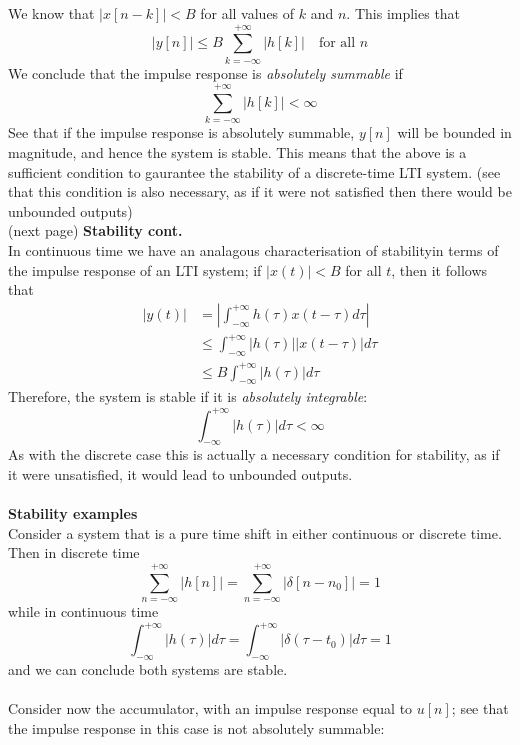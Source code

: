 \documentclass{report}
\begin{document}
We know that $|x[n-k]|<B$ for all values of $k$ and $n$. This implies that
\begin{equation*}
|y[n]|\leq B\sum^{+\infty}_{k=-\infty}|h[k]|\quad\text{for all }n
\end{equation*}
We conclude that the impulse response is \textit{absolutely summable} if
\begin{equation*}
\sum^{+\infty}_{k=-\infty}|h[k]|<\infty
\end{equation*}
See that if the impulse response is absolutely summable, $y[n]$ will be bounded in magnitude, and hence the system is stable. This means
that the above is a sufficient condition to gaurantee the stability of a discrete-time LTI system. (see that this condition 
is also necessary, as if it were not satisfied then there would be unbounded outputs)\\
(next page)\newpage
\noindent\textbf{Stability cont.}\\
In continuous time we have an analagous characterisation of stabilityin terms of the impulse response of an LTI system; 
if $|x(t)|<B$ for all $t$, then it follows that
\begin{align*}
|y(t)|&=\left|\int^{+\infty}_{-\infty}h(\tau)x(t-\tau)d\tau\right|\\
&\leq\int^{+\infty}_{-\infty}|h(\tau)||x(t-\tau)|d\tau\\
&\leq B\int^{+\infty}_{-\infty}|h(\tau)|d\tau
\end{align*}
Therefore, the system is stable if it is \textit{absolutely integrable}:
\begin{equation*}
\int^{+\infty}_{-\infty}|h(\tau)|d\tau<\infty
\end{equation*}
As with the discrete case this is actually a necessary condition for stability, as if it were unsatisfied, it would lead to unbounded 
outputs.\\
\vspace{1mm}\\
\textbf{Stability examples}\\
Consider a system that is a pure time shift in either continuous or discrete time. Then in discrete time 
\begin{equation*}
\sum^{+\infty}_{n=-\infty}|h[n]|=
\sum^{+\infty}_{n=-\infty}|\delta[n-n_0]|=1
\end{equation*}
while in continuous time
\begin{equation*}
\int^{+\infty}_{-\infty}|h(\tau)|d\tau=
\int^{+\infty}_{-\infty}|\delta(\tau-t_0)|d\tau=1
\end{equation*}
and we can conclude both systems are stable.\\
\vspace{1mm}\\
Consider now the accumulator, with an impulse response equal to $u[n]$; see that the impulse response in this case is not absolutely
summable:
\end{document}
